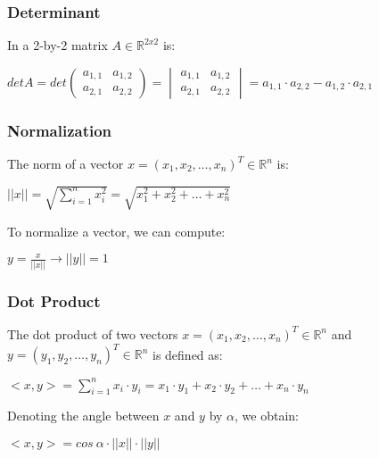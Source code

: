 \documentclass{article}
\begin{document}
\subsubsection{Determinant}
In a 2-by-2 matrix $A \in \mathbb{R}^{2x2}$ is:
\begin{center}
    $ det A = det
    \begin{pmatrix}
        a_{1,1} & a_{1,2} \\
        a_{2,1} & a_{2,2} 
    \end{pmatrix}
    =
    \begin{vmatrix}
        a_{1,1} & a_{1,2} \\
        a_{2,1} & a_{2,2} 
    \end{vmatrix}
    = a_{1,1} \cdot a_{2,2} - a_{1,2} \cdot a_{2,1} $
\end{center}
\subsubsection{Normalization}
The norm of a vector $ x = (x_1, x_2, \dots, x_n)^T \in \mathbb{R}^n $ is:
\begin{center}
    $ ||x|| = \sqrt{\displaystyle\sum^n_{i=1}x_i^2} = \sqrt{x_1^2 + x_2^2 + \dots + x_n^2} $ \\
\end{center}
To normalize a vector, we can compute:
\begin{center}
    $ y = \displaystyle\frac{x}{||x||} \rightarrow ||y|| = 1 $
\end{center}
\subsubsection{Dot Product}
The dot product of two vectors $ x = (x_1, x_2, \dots, x_n)^T \in \mathbb{R}^n $ and $ y = (y_1, y_2, \dots, y_n)^T \in \mathbb{R}^n $ is defined as:
\begin{center}
    $ <x,y> = \displaystyle\sum^n_{i = 1}x_i \cdot y_i = x_1 \cdot y_1 + x_2 \cdot y_2 + \dots + x_n \cdot y_n $ \\
\end{center}
Denoting the angle between $ x $ and $ y $ by $ \alpha $, we obtain:
\begin{center}
    $ <x,y> = cos \ \alpha \cdot ||x|| \cdot ||y||$
\end{center}
\end{document}
